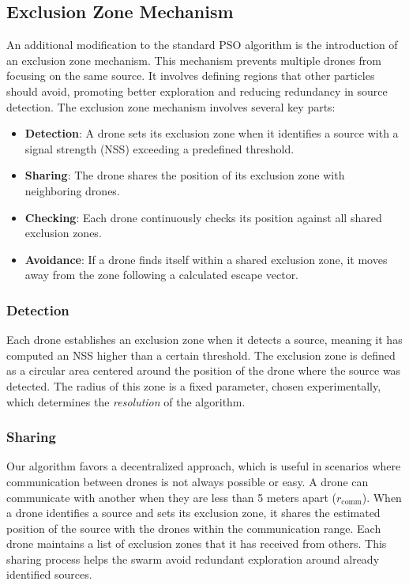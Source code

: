 \subsection{Exclusion Zone Mechanism}
An additional modification to the standard PSO algorithm 
is the introduction of an exclusion zone mechanism.
This mechanism prevents multiple drones from focusing 
on the same source. It involves defining regions that 
other particles should avoid, promoting better exploration 
and reducing redundancy in source detection. The exclusion 
zone mechanism involves several key parts:
\begin{itemize}
    \item \textbf{Detection}: A drone sets its exclusion zone 
    when it identifies a source with a signal strength (NSS) 
    exceeding a predefined threshold.
    \item \textbf{Sharing}: The drone shares the position of 
    its exclusion zone with neighboring drones.
    \item \textbf{Checking}: Each drone continuously checks 
    its position against all shared exclusion zones.
    \item \textbf{Avoidance}: If a drone finds itself within 
    a shared exclusion zone, it moves away from the zone 
    following a calculated escape vector.
\end{itemize}

\subsubsection{Detection}
Each drone establishes an exclusion zone when it detects a 
source, meaning it has computed an NSS higher than a certain 
threshold. The exclusion zone is defined as a circular area 
centered around the position of the drone where the source 
was detected. The radius of this zone is a fixed parameter, 
chosen experimentally, which determines the \textit{resolution} 
of the algorithm.

\subsubsection{Sharing}
Our algorithm favors a decentralized approach, which is useful 
in scenarios where communication between drones is not always 
possible or easy. A drone can communicate with another when 
they are less than 5 meters apart (\(r_{\text{comm}}\)).
When a drone identifies a source 
and sets its exclusion zone, it shares the estimated position 
of the source with the drones within the communication range. 
Each drone maintains a list of exclusion zones that it has 
received from others. This sharing process helps the swarm 
avoid redundant exploration around already identified sources.

